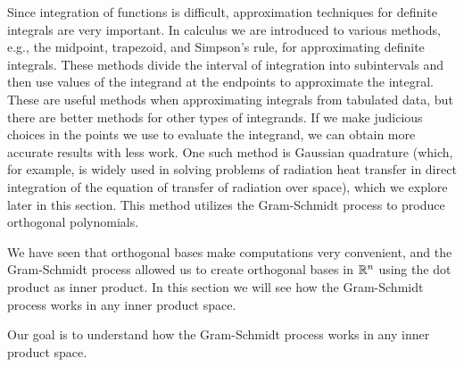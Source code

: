  \label{sec:gram_schmidt_ips}

\vspace*{-17 pt}

\vspace*{13 pt}


Since integration of functions is difficult, approximation techniques for definite integrals are very important. In calculus we are introduced to various methods, e.g., the midpoint, trapezoid, and Simpson's rule,  for approximating definite integrals. These methods divide the interval of integration into subintervals and then use values of the integrand at the endpoints to approximate the integral. These are useful methods when approximating integrals from tabulated data, but there are better methods for other types of integrands. If we make judicious choices in the points we use to evaluate the integrand, we can obtain more accurate results with less work. One such method is Gaussian quadrature (which, for example, is widely used in solving problems of radiation heat transfer in direct integration of the equation of transfer of radiation over space), which we explore later in this section. This method utilizes the Gram-Schmidt process to produce orthogonal polynomials.


We have seen that orthogonal bases make computations very convenient, and the Gram-Schmidt process allowed us to create orthogonal bases in $\mathbb{R}^n$ using the dot product as inner product. In this section we will see how the Gram-Schmidt process works in any inner product space.  



Our goal is to understand how the Gram-Schmidt process works in any inner product space. 

